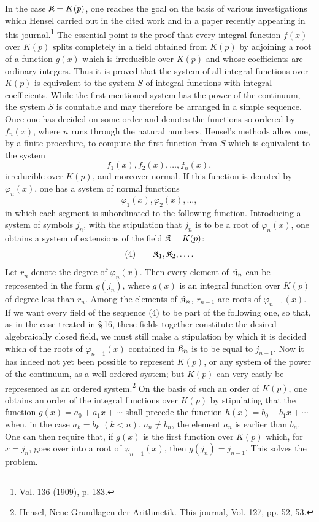 In the case \(\mathfrak K=K(p)\), one reaches the goal on the basis of various investigations which Hensel carried out in the cited work and in a paper recently appearing in this journal.\footnote{Vol. 136 (1909), p. 183.} The essential point is the proof that every integral function \(f(x)\) over \(K(p)\) splits completely in a field obtained from \(K(p)\) by adjoining a root of a function \(g(x)\) which is irreducible over \(K(p)\) and whose coefficients are ordinary integers. Thus it is proved that the system of all integral functions over \(K(p)\) is equivalent to the system \(S\) of integral functions with integral coefficients. While the first-mentioned system has the power of the continuum, the system \(S\) is countable and may therefore be arranged in a simple sequence. Once one has decided on some order and denotes the functions so ordered by \(f_n(x)\), where \(n\) runs through the natural numbers, Hensel's methods allow one, by a finite procedure, to compute the first function from \(S\) which is equivalent to the system
\[
f_1(x),f_2(x),\ldots,f_n(x),
\]
irreducible over \(K(p)\), and moreover normal. If this function is denoted by \(\varphi_n(x)\), one has a system of normal functions
\[
\varphi_1(x),\varphi_2(x),\ldots,
\]
in which each segment is subordinated to the following function. Introducing a system of symbols \(j_n\), with the stipulation that \(j_n\) is to be a root of \(\varphi_n(x)\), one obtains a system of extensions of the field \(\mathfrak K=K(p)\):
\[
(4)\qquad \mathfrak K_1,\mathfrak K_2,\ldots.
\]
Let \(r_n\) denote the degree of \(\varphi_n(x)\). Then every element of \(\mathfrak K_n\) can be represented in the form \(g(j_n)\), where \(g(x)\) is an integral function over \(K(p)\) of degree less than \(r_n\). Among the elements of \(\mathfrak K_n\), \(r_{n-1}\) are roots of \(\varphi_{n-1}(x)\). If we want every field of the sequence (4) to be part of the following one, so that, as in the case treated in \S\,16, these fields together constitute the desired algebraically closed field, we must still make a stipulation by which it is decided which of the roots of \(\varphi_{n-1}(x)\) contained in \(\mathfrak K_n\) is to be equal to \(j_{n-1}\). Now it has indeed not yet been possible to represent \(K(p)\), or any system of the power of the continuum, as a well-ordered system; but \(K(p)\) can very easily be represented as an ordered system.\footnote{Hensel, Neue Grundlagen der Arithmetik. This journal, Vol. 127, pp. 52, 53.} On the basis of such an order of \(K(p)\), one obtains an order of the integral functions over \(K(p)\) by stipulating that the function \(g(x)=a_0+a_1x+\cdots\) shall precede the function \(h(x)=b_0+b_1x+\cdots\) when, in the case \(a_k=b_k\) \((k<n)\), \(a_n\neq b_n\), the element \(a_n\) is earlier than \(b_n\). One can then require that, if \(g(x)\) is the first function over \(K(p)\) which, for \(x=j_n\), goes over into a root of \(\varphi_{n-1}(x)\), then \(g(j_n)=j_{n-1}\). This solves the problem.

